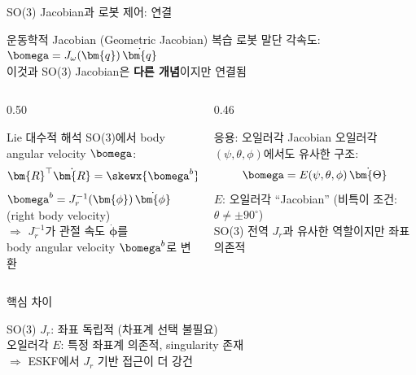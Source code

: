 \begin{frame}[shrink=5]{SO(3) Jacobian과 로봇 제어: 연결}
  \begin{block}{운동학적 Jacobian (Geometric Jacobian) 복습}
    로봇 말단 각속도: $\bomega = J_\omega(\bm{q})\,\dot{\bm{q}}$\\
    이것과 SO(3) Jacobian은 \textbf{다른 개념}이지만 연결됨
  \end{block}
  \pause
  \begin{columns}[T]
    \begin{column}{0.50\textwidth}
      \begin{block}{Lie 대수적 해석}
        SO(3)에서 body angular velocity $\bomega$:
        \[
          \bm{R}^\top\dot{\bm{R}} = \skewx{\bomega^b} \in \mathfrak{so}(3)
        \]
        $\bomega^b = J_r^{-1}(\bm{\phi})\,\dot{\bm{\phi}}$ (right body velocity)\\
        \medskip
        $\Rightarrow$ $J_r^{-1}$가 관절 속도 $\dot{\bm{\phi}}$를\\
        body angular velocity $\bomega^b$로 변환
      \end{block}
    \end{column}
    \begin{column}{0.46\textwidth}
      \begin{exampleblock}{응용: 오일러각 Jacobian}
        오일러각 $(\psi, \theta, \phi)$에서도 유사한 구조:
        \[
          \bomega = E(\psi,\theta,\phi)\,\dot{\bm{\Theta}}
        \]
        $E$: 오일러각 ``Jacobian'' (비특이 조건: $\theta \neq \pm90^\circ$)\\
        SO(3) 전역 $J_r$과 유사한 역할이지만 좌표 의존적
      \end{exampleblock}
    \end{column}
  \end{columns}
  \pause
  \vspace{0.3em}
  \begin{alertblock}{핵심 차이}
    \begin{center}
      SO(3) $J_r$: 좌표 독립적 (차표계 선택 불필요)\\
      오일러각 $E$: 특정 좌표계 의존적, singularity 존재\\
      $\Rightarrow$ ESKF에서 $J_r$ 기반 접근이 더 강건
    \end{center}
  \end{alertblock}
\end{frame}


